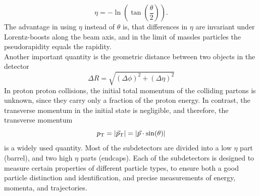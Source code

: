 \begin{equation}
 \eta=-\ln\left(\tan\left(\frac{\theta}{2}\right)\right).
\end{equation}
The advantage in using $\eta$ instead of $\theta$ is, that differences in $\eta$ are invariant under Lorentz-boosts along the beam axis, and in the limit of massles particles the pseudorapidity equals the rapidity.\\
Another important quantity is the geometric distance between two objects in the detector
\begin{equation}
 \Delta R = \sqrt{(\Delta\phi)^2 + (\Delta\eta)^2}
\end{equation}
In proton proton collisions, the initial total momentum of the colliding partons is unknown, since they carry only a fraction of the proton energy. In contrast, the transverse momentum in the initial state is negligible, and therefore, the transverse momentum
\begin{equation}
 p_{\mathrm{T}}=|{\vec p}_{\mathrm{T}}|=|\vec{p}\cdot\sin(\theta)|
\end{equation}
is a widely used quantity.
Most of the subdetectors are divided into a low $\eta$ part (barrel), and two high $\eta$ parts (endcaps). Each of the subdetectors is designed to measure certain properties of different particle types, to ensure both a good particle distinction and identification, and precise measurements of energy, momenta, and trajectories.



